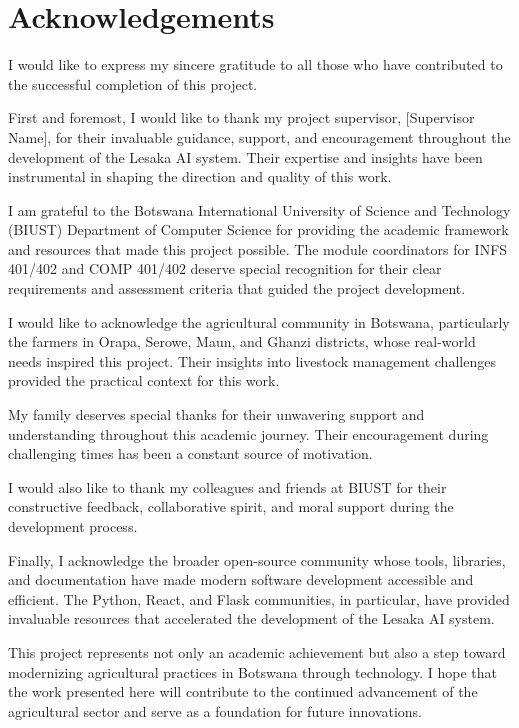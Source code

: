 
\chapter*{Acknowledgements}

I would like to express my sincere gratitude to all those who have contributed to the successful completion of this project.

First and foremost, I would like to thank my project supervisor, [Supervisor Name], for their invaluable guidance, support, and encouragement throughout the development of the Lesaka AI system. Their expertise and insights have been instrumental in shaping the direction and quality of this work.

I am grateful to the Botswana International University of Science and Technology (BIUST) Department of Computer Science for providing the academic framework and resources that made this project possible. The module coordinators for INFS 401/402 and COMP 401/402 deserve special recognition for their clear requirements and assessment criteria that guided the project development.

I would like to acknowledge the agricultural community in Botswana, particularly the farmers in Orapa, Serowe, Maun, and Ghanzi districts, whose real-world needs inspired this project. Their insights into livestock management challenges provided the practical context for this work.

My family deserves special thanks for their unwavering support and understanding throughout this academic journey. Their encouragement during challenging times has been a constant source of motivation.

I would also like to thank my colleagues and friends at BIUST for their constructive feedback, collaborative spirit, and moral support during the development process.

Finally, I acknowledge the broader open-source community whose tools, libraries, and documentation have made modern software development accessible and efficient. The Python, React, and Flask communities, in particular, have provided invaluable resources that accelerated the development of the Lesaka AI system.

This project represents not only an academic achievement but also a step toward modernizing agricultural practices in Botswana through technology. I hope that the work presented here will contribute to the continued advancement of the agricultural sector and serve as a foundation for future innovations.
